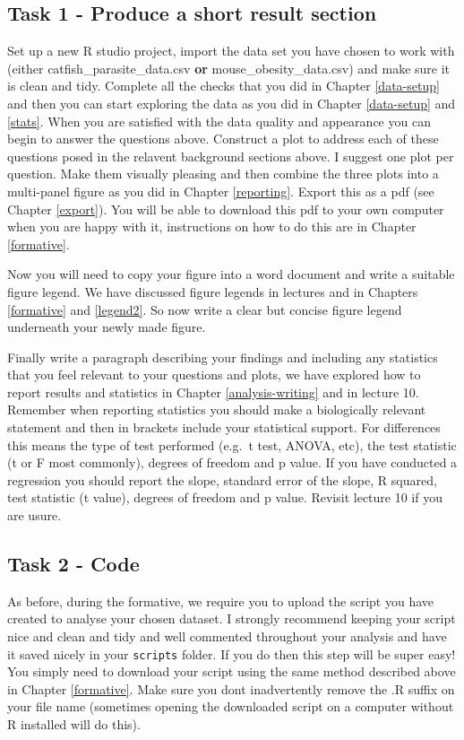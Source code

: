 \documentclass[
]{book}
\begin{document}
\subsection{Task 1 - Produce a short result section}\label{task-1---produce-a-short-result-section}

Set up a new R studio project, import the data set you have chosen to work with (either catfish\_parasite\_data.csv \textbf{or} mouse\_obesity\_data.csv) and make sure it is clean and tidy. Complete all the checks that you did in Chapter \ref{data-setup} and then you can start exploring the data as you did in Chapter \ref{data-setup} and \ref{stats}. When you are satisfied with the data quality and appearance you can begin to answer the questions above. Construct a plot to address each of these questions posed in the relavent background sections above. I suggest one plot per question. Make them visually pleasing and then combine the three plots into a multi-panel figure as you did in Chapter \ref{reporting}. Export this as a pdf (see Chapter \ref{export}). You will be able to download this pdf to your own computer when you are happy with it, instructions on how to do this are in Chapter \ref{formative}.

Now you will need to copy your figure into a word document and write a suitable figure legend. We have discussed figure legends in lectures and in Chapters \ref{formative} and \ref{legend2}. So now write a clear but concise figure legend underneath your newly made figure.

Finally write a paragraph describing your findings and including any statistics that you feel relevant to your questions and plots, we have explored how to report results and statistics in Chapter \ref{analysis-writing} and in lecture 10. Remember when reporting statistics you should make a biologically relevant statement and then in brackets include your statistical support. For differences this means the type of test performed (e.g.~t test, ANOVA, etc), the test statistic (t or F most commonly), degrees of freedom and p value. If you have conducted a regression you should report the slope, standard error of the slope, R squared, test statistic (t value), degrees of freedom and p value. Revisit lecture 10 if you are usure.

\subsection{Task 2 - Code}\label{task-2---code}

As before, during the formative, we require you to upload the script you have created to analyse your chosen dataset. I strongly recommend keeping your script nice and clean and tidy and well commented throughout your analysis and have it saved nicely in your \texttt{scripts} folder. If you do then this step will be super easy! You simply need to download your script using the same method described above in Chapter \ref{formative}. Make sure you dont inadvertently remove the .R suffix on your file name (sometimes opening the downloaded script on a computer without R installed will do this).
\end{document}
